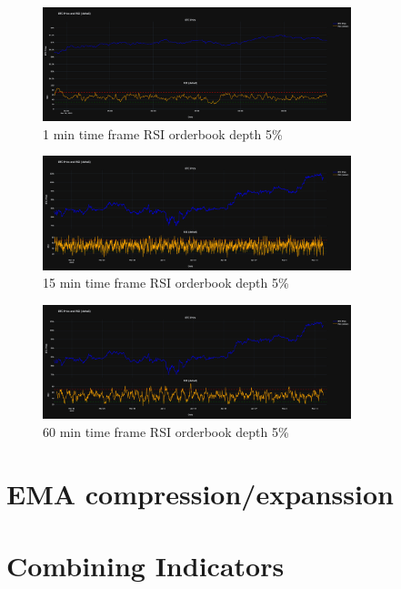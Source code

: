 \documentclass[12pt]{article}
\begin{document}
\begin{figure}[H]
    \centering
    \includegraphics[width=0.8\textwidth]{imgs/RSI1min.png}
    \caption{1 min time frame RSI orderbook depth 5\%}    
\end{figure}
\begin{figure}[H]
    \centering
    \includegraphics[width=0.8\textwidth]{imgs/15minRsi.png}
    \caption{15 min time frame RSI orderbook depth 5\%}
\end{figure}

\begin{figure}[H]
    \centering
    \includegraphics[width=0.8\textwidth]{imgs/60minRSI.png}
    \caption{60 min time frame RSI orderbook depth 5\%}
\end{figure}




\section*{EMA compression/expanssion}



\newpage


\section*{Combining Indicators}
\end{document}

